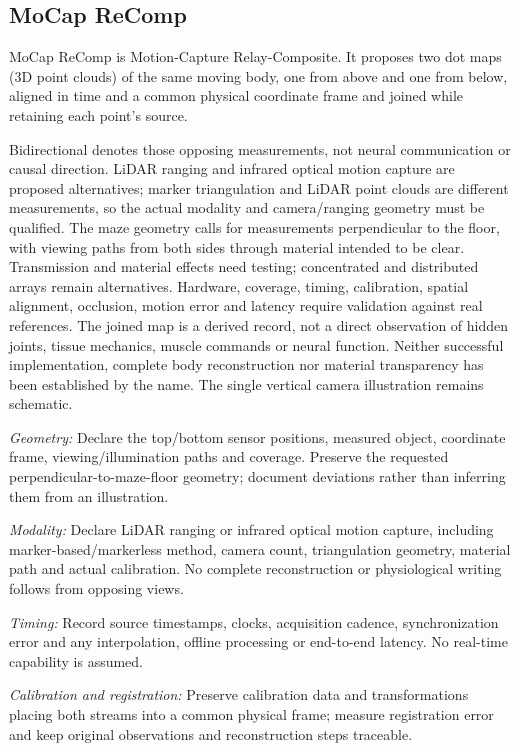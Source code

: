 \subsection*{MoCap ReComp}
\noindent MoCap ReComp is Motion-Capture Relay-Composite. It proposes two dot maps (3D point clouds) of the same moving body, one from above and one from below, aligned in time and a common physical coordinate frame and joined while retaining each point’s source.\par
\noindent Bidirectional denotes those opposing measurements, not neural communication or causal direction. LiDAR ranging and infrared optical motion capture are proposed alternatives; marker triangulation and LiDAR point clouds are different measurements, so the actual modality and camera/ranging geometry must be qualified. The maze geometry calls for measurements perpendicular to the floor, with viewing paths from both sides through material intended to be clear. Transmission and material effects need testing; concentrated and distributed arrays remain alternatives. Hardware, coverage, timing, calibration, spatial alignment, occlusion, motion error and latency require validation against real references. The joined map is a derived record, not a direct observation of hidden joints, tissue mechanics, muscle commands or neural function. Neither successful implementation, complete body reconstruction nor material transparency has been established by the name. The single vertical camera illustration remains schematic.\par
\noindent\textit{Geometry:} Declare the top/bottom sensor positions, measured object, coordinate frame, viewing/illumination paths and coverage. Preserve the requested perpendicular-to-maze-floor geometry; document deviations rather than inferring them from an illustration.\par
\noindent\textit{Modality:} Declare LiDAR ranging or infrared optical motion capture, including marker-based/markerless method, camera count, triangulation geometry, material path and actual calibration. No complete reconstruction or physiological writing follows from opposing views.\par
\noindent\textit{Timing:} Record source timestamps, clocks, acquisition cadence, synchronization error and any interpolation, offline processing or end-to-end latency. No real-time capability is assumed.\par
\noindent\textit{Calibration and registration:} Preserve calibration data and transformations placing both streams into a common physical frame; measure registration error and keep original observations and reconstruction steps traceable.\par
